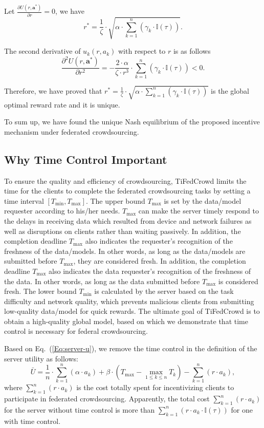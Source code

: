 \documentclass[final,1p,times]{elsarticle}
\begin{document}
Let $\frac{\partial U(r,\bm{a}^\ast)}{\partial r} = 0$, we have
\begin{equation}\label{eq:opt_r}
	r^\ast =\frac{1}{\zeta}\cdot\sqrt{\alpha\cdot\sum_{k=1}^n(\gamma_k\cdot\mathbb{I}(\tau))}.
\end{equation}	

The second derivative of $u_k(r,a_k)$ with respect to $r$ is as follows
\begin{equation}
	\frac{\partial^2 U(r,\bm{a}^\ast)}{\partial r^2} = - \frac{2\cdot\alpha}{\zeta\cdot r^3}\cdot\sum_{k=1}^n(\gamma_k\cdot\mathbb{I}(\tau)) < 0.
\end{equation}	

Therefore, we have proved that $r^\ast = \frac{1}{\zeta}\cdot\sqrt{\alpha\cdot\sum_{k=1}^n(\gamma_k\cdot\mathbb{I}(\tau))}$ is the global optimal reward rate and it is unique. 

To sum up, we have found the unique Nash equilibrium of the proposed incentive mechanism under federated crowdsourcing.

\subsection{Why Time Control Important}
To ensure the quality and efficiency of crowdsourcing, TiFedCrowd limits the time for the clients to complete the federated crowdsourcing tasks by setting a time interval $[T_{\min},T_{\max}]$. The upper bound $T_{\max}$ is set by the data/model requester according to his/her needs. $T_{\max}$ can make the server timely respond to the delays in receiving data which resulted from device and network failures as well as disruptions on clients rather than waiting passively. In addition, the completion deadline $T_{\max}$ also indicates the requester's recognition of the freshness of the data/models. In other words, as long as the data/models are submitted before $T_{\max}$, they are considered fresh. In addition, the completion deadline $T_{\max}$ also indicates the data requester's recognition of the freshness of the data. In other words, as long as the data submitted before $T_{\max}$ is considered fresh. The lower bound $T_{\min}$ is calculated by the server based on the task difficulty and network quality, which prevents malicious clients from submitting low-quality data/model for quick rewards. The ultimate goal of TiFedCrowd is to obtain a high-quality global model, based on which we demonstrate that time control is necessary for federal crowdsourcing.

Based on Eq.~(\ref{Eq:server-u}), we remove the time control in the definition of the server utility as follows: 
\begin{equation}
	\bar{U} = \frac{1}{n}\cdot \sum_{k=1}^n(\alpha\cdot a_k) + \beta\cdot(T_{\max}-\max_{1\le k\le n}T_k) - \sum_{k=1}^n(r\cdot a_k),
\end{equation}
where $\sum_{k=1}^n(r\cdot a_k)$ is the cost totally spent for incentivizing clients to participate in federated crowdsourcing. Apparently, the total cost $\sum_{k=1}^n(r\cdot a_k)$ for the server without time control is more than $\sum_{k=1}^n(r\cdot a_k\cdot \mathbb{I}(\tau))$ for one with time control.
\end{document}
